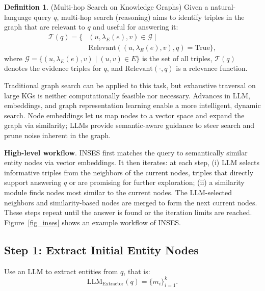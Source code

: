 \documentclass{article}
\theoremstyle{plain}
\theoremstyle{definition}
\newtheorem{definition}[theorem]{Definition}
\theoremstyle{remark}
\begin{document}
\begin{definition}
\label{def2}
(Multi-hop Search on Knowledge Graphs)
Given a natural-language query $q$, multi-hop search (reasoning) aims to identify triples in the graph that are relevant to $q$ and useful for answering it:
\begin{equation*}
\begin{split}
\mathcal{T}(q)=\{&(u,\lambda_E(e),v)\in \mathcal{G}\mid\\ &\mathrm{Relevant}((u,\lambda_E(e),v),q)=\mathrm{True}\},
\end{split}
\end{equation*}
where $\mathcal{G}=\{(u,\lambda_E(e),v)\mid (u,v)\in E\}$ is the set of all triples, $\mathcal{T}(q)$ denotes the evidence triples for $q$, and $\mathrm{Relevant}(\cdot,q)$ is a relevance function.
\end{definition}

Traditional graph search can be applied to this task, but exhaustive traversal on large KGs is neither computationally feasible nor necessary. Advances in LLM, embeddings, and graph representation learning enable a more intelligent, dynamic search. Node embeddings let us map nodes to a vector space and expand the graph via similarity; LLMs provide semantic-aware guidance to steer search and prune noise inherent in the graph. 


\textbf{High-level workflow}. INSES first matches the query to semantically similar entity nodes via vector embeddings. It then iterates: at each step, (i) LLM selects informative triples from the neighbors of the current nodes, triples that directly support answering $q$ or are promising for further exploration; (ii) a similarity module finds nodes most similar to the current nodes. The LLM-selected neighbors and similarity-based nodes are merged to form the next current nodes. These steps repeat until the answer is found or the iteration limits are reached. Figure~\ref{fig_inses} shows an example workflow of INSES. 

\subsection{Step 1: Extract Initial Entity Nodes}
Use an LLM to extract entities from $q$, that is:
$$
\mathrm{LLM_{Extractor}}(q)=\{m_i\}_{i=1}^k .
$$
\end{document}
